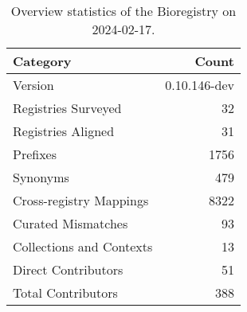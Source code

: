 \begin{table}
\caption{Overview statistics of the Bioregistry on 2024-02-17.}
\label{tab:bioregistry-summary}
\begin{tabular}{lr}
\toprule
Category & Count \\
\midrule
Version & 0.10.146-dev \\
Registries Surveyed & 32 \\
Registries Aligned & 31 \\
Prefixes & 1756 \\
Synonyms & 479 \\
Cross-registry Mappings & 8322 \\
Curated Mismatches & 93 \\
Collections and Contexts & 13 \\
Direct Contributors & 51 \\
Total Contributors & 388 \\
\bottomrule
\end{tabular}
\end{table}
